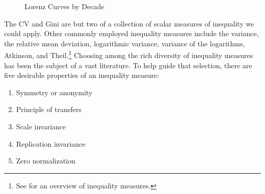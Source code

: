 \documentclass[
  a4paper, 
  twoside,
  final
]{article}
\providecommand{\tightlist}{%
  \setlength{\itemsep}{0pt}\setlength{\parskip}{0pt}}\usepackage{longtable,booktabs,array}
\begin{document}
\begin{figure}[H]


\caption{\label{fig-lcs}Lorenz Curves by Decade}

\end{figure}%

The CV and Gini are but two of a collection of scalar measures of
inequality we could apply. Other commonly employed inequality measures
include the variance, the relative mean deviation, logarithmic variance,
variance of the logarithms, Atkinson, and Theil.\footnote{See
  \citet{cowell2011MeasuringInequality} for an overview of inequality
  measures.} Choosing among the rich diversity of inequality measures
has been the subject of a vast literature. To help guide that selection,
there are five desirable properties of an inequality measure:

\begin{enumerate}
\def\labelenumi{\arabic{enumi}.}
\tightlist
\item
  Symmetry or anonymity
\item
  Principle of transfers
\item
  Scale invariance
\item
  Replication invariance
\item
  Zero normalization
\end{enumerate}
\end{document}

